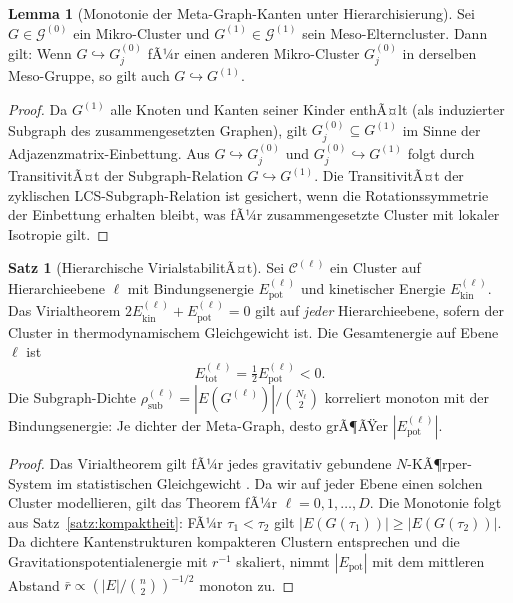 ﻿\documentclass[a4paper,12pt]{report}
\theoremstyle{definition}
\newtheorem{satz}{Satz}
\newtheorem{lemma}{Lemma}
\begin{document}
\begin{lemma}[Monotonie der Meta-Graph-Kanten unter Hierarchisierung]
\label{lem:monotonie_meta}
Sei $G \in \mathcal{G}^{(0)}$ ein Mikro-Cluster und $G^{(1)} \in \mathcal{G}^{(1)}$ sein Meso-Elterncluster. Dann gilt: Wenn $G \hookrightarrow G^{(0)}_j$ fÃ¼r einen anderen Mikro-Cluster $G^{(0)}_j$ in derselben Meso-Gruppe, so gilt auch $G \hookrightarrow G^{(1)}$.
\end{lemma}

\begin{proof}
Da $G^{(1)}$ alle Knoten und Kanten seiner Kinder enthÃ¤lt (als induzierter Subgraph des zusammengesetzten Graphen), gilt $G^{(0)}_j \subseteq G^{(1)}$ im Sinne der Adjazenzmatrix-Einbettung. Aus $G \hookrightarrow G^{(0)}_j$ und $G^{(0)}_j \hookrightarrow G^{(1)}$ folgt durch TransitivitÃ¤t der Subgraph-Relation $G \hookrightarrow G^{(1)}$. Die TransitivitÃ¤t der zyklischen LCS-Subgraph-Relation ist gesichert, wenn die Rotationssymmetrie der Einbettung erhalten bleibt, was fÃ¼r zusammengesetzte Cluster mit lokaler Isotropie gilt.
\end{proof}

\begin{satz}[Hierarchische VirialstabilitÃ¤t]
\label{satz:hier_virial}
Sei $\mathcal{C}^{(\ell)}$ ein Cluster auf Hierarchieebene $\ell$ mit Bindungsenergie $E^{(\ell)}_\mathrm{pot}$ und kinetischer Energie $E^{(\ell)}_\mathrm{kin}$. Das Virialtheorem $2E^{(\ell)}_\mathrm{kin} + E^{(\ell)}_\mathrm{pot} = 0$ gilt auf \emph{jeder} Hierarchieebene, sofern der Cluster in thermodynamischem Gleichgewicht ist. Die Gesamtenergie auf Ebene $\ell$ ist
\[
E^{(\ell)}_\mathrm{tot} = \tfrac{1}{2} E^{(\ell)}_\mathrm{pot} < 0.
\]
Die Subgraph-Dichte $\rho^{(\ell)}_\mathrm{sub} = |E(G^{(\ell)})| / \binom{N_\ell}{2}$ korreliert monoton mit der Bindungsenergie: Je dichter der Meta-Graph, desto grÃ¶ÃŸer $|E^{(\ell)}_\mathrm{pot}|$.
\end{satz}

\begin{proof}
Das Virialtheorem gilt fÃ¼r jedes gravitativ gebundene $N$-KÃ¶rper-System im statistischen Gleichgewicht \cite{spitzer1987}. Da wir auf jeder Ebene einen solchen Cluster modellieren, gilt das Theorem fÃ¼r $\ell = 0, 1, \ldots, D$. Die Monotonie folgt aus Satz~\ref{satz:kompaktheit}: FÃ¼r $\tau_1 < \tau_2$ gilt $|E(G(\tau_1))| \geq |E(G(\tau_2))|$. Da dichtere Kantenstrukturen kompakteren Clustern entsprechen und die Gravitationspotentialenergie mit $r^{-1}$ skaliert, nimmt $|E_\mathrm{pot}|$ mit dem mittleren Abstand $\bar{r} \propto (|E|/\binom{n}{2})^{-1/2}$ monoton zu.
\end{proof}
\end{document}

